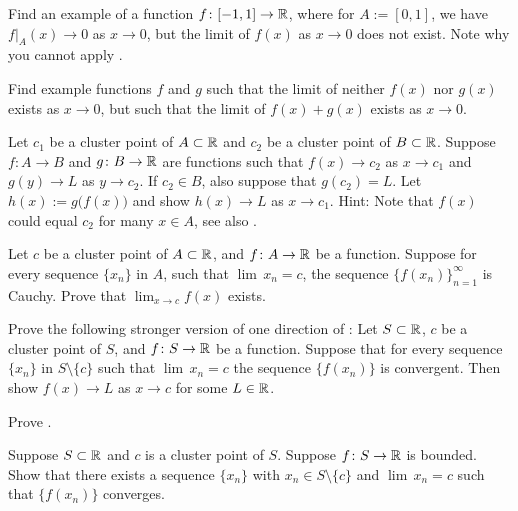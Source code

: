 \begin{exercise}
Find an example of a function $f \colon [-1,1] \to {\mathbb{R}}$, where for
$A:=[0,1]$, we have
$f|_A(x) \to 0$ as $x \to 0$, but the limit of $f(x)$ as $x \to 0$
does not exist.  Note why you cannot apply
.
\end{exercise}

\begin{exercise}
Find example functions $f$ and $g$ such that the limit of neither $f(x)$
nor $g(x)$ exists as $x \to 0$, but such that the limit of $f(x)+g(x)$ exists
as $x \to 0$.
\end{exercise}

\begin{exercise} \label{exercise:contlimitcomposition}
Let $c_1$ be a cluster point of $A \subset {\mathbb{R}}$ and $c_2$ be
a cluster point of $B \subset {\mathbb{R}}$.  Suppose 
$f \colon A \to B$ and $g \colon B \to {\mathbb{R}}$ are functions
such that
$f(x) \to c_2$ as $x \to c_1$ and
$g(y) \to L$ as $y \to c_2$.  If $c_2 \in B$, also suppose that $g(c_2) = L$.  Let $h(x) := g\bigl(f(x)\bigr)$ and show
$h(x) \to L$ as $x \to c_1$.
Hint: Note that $f(x)$ could equal $c_2$ for many $x \in A$,
see also
.
\end{exercise}

\begin{exercise}
Let $c$ be a cluster point of $A \subset {\mathbb{R}}$, and $f \colon A \to {\mathbb{R}}$
be a function.  Suppose for every sequence $\{x_n\}$ in $A$,
such that $\lim\, x_n = c$,
the sequence $\{ f(x_n) \}_{n=1}^\infty$ is Cauchy.  Prove that
$\lim_{x\to c} f(x)$ exists.
\end{exercise}

\begin{exercise} \label{exercise:seqflimitalt}
Prove the following stronger version of one direction of
:
Let $S \subset {\mathbb{R}}$, $c$ be a cluster point of $S$, and $f \colon S \to
{\mathbb{R}}$ be a function.
Suppose that for every sequence $\{x_n\}$ in $S \setminus \{c\}$ such that
$\lim\, x_n = c$ the sequence $\{ f(x_n) \}$ is convergent.
Then show $f(x) \to L$ as $x \to c$ for some $L \in {\mathbb{R}}$.
\end{exercise}

\begin{exercise}
Prove .
\end{exercise}

\begin{exercise}
Suppose $S \subset {\mathbb{R}}$ and $c$ is a cluster point of $S$.  Suppose $f \colon
S \to {\mathbb{R}}$ is bounded.  Show that there exists a sequence $\{ x_n \}$
with $x_n \in S \setminus \{ c \}$ and $\lim\, x_n = c$ such that
$\{ f(x_n) \}$ converges.
\end{exercise}

